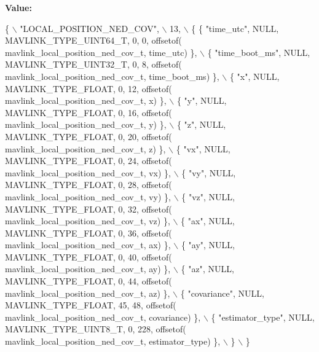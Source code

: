 {\bfseries Value\+:}
\begin{DoxyCode}
\{ \(\backslash\)
    \textcolor{stringliteral}{"LOCAL\_POSITION\_NED\_COV"}, \(\backslash\)
    13, \(\backslash\)
    \{  \{ \textcolor{stringliteral}{"time\_utc"}, NULL, MAVLINK_TYPE_UINT64_T, 0, 0, offsetof(
      mavlink_local_position_ned_cov_t, time\_utc) \}, \(\backslash\)
         \{ \textcolor{stringliteral}{"time\_boot\_ms"}, NULL, MAVLINK_TYPE_UINT32_T, 0, 8, offsetof(
      mavlink_local_position_ned_cov_t, time\_boot\_ms) \}, \(\backslash\)
         \{ \textcolor{stringliteral}{"x"}, NULL, MAVLINK_TYPE_FLOAT, 0, 12, offsetof(
      mavlink_local_position_ned_cov_t, x) \}, \(\backslash\)
         \{ \textcolor{stringliteral}{"y"}, NULL, MAVLINK_TYPE_FLOAT, 0, 16, offsetof(
      mavlink_local_position_ned_cov_t, y) \}, \(\backslash\)
         \{ \textcolor{stringliteral}{"z"}, NULL, MAVLINK_TYPE_FLOAT, 0, 20, offsetof(
      mavlink_local_position_ned_cov_t, z) \}, \(\backslash\)
         \{ \textcolor{stringliteral}{"vx"}, NULL, MAVLINK_TYPE_FLOAT, 0, 24, offsetof(
      mavlink_local_position_ned_cov_t, vx) \}, \(\backslash\)
         \{ \textcolor{stringliteral}{"vy"}, NULL, MAVLINK_TYPE_FLOAT, 0, 28, offsetof(
      mavlink_local_position_ned_cov_t, vy) \}, \(\backslash\)
         \{ \textcolor{stringliteral}{"vz"}, NULL, MAVLINK_TYPE_FLOAT, 0, 32, offsetof(
      mavlink_local_position_ned_cov_t, vz) \}, \(\backslash\)
         \{ \textcolor{stringliteral}{"ax"}, NULL, MAVLINK_TYPE_FLOAT, 0, 36, offsetof(
      mavlink_local_position_ned_cov_t, ax) \}, \(\backslash\)
         \{ \textcolor{stringliteral}{"ay"}, NULL, MAVLINK_TYPE_FLOAT, 0, 40, offsetof(
      mavlink_local_position_ned_cov_t, ay) \}, \(\backslash\)
         \{ \textcolor{stringliteral}{"az"}, NULL, MAVLINK_TYPE_FLOAT, 0, 44, offsetof(
      mavlink_local_position_ned_cov_t, az) \}, \(\backslash\)
         \{ \textcolor{stringliteral}{"covariance"}, NULL, MAVLINK_TYPE_FLOAT, 45, 48, offsetof(
      mavlink_local_position_ned_cov_t, covariance) \}, \(\backslash\)
         \{ \textcolor{stringliteral}{"estimator\_type"}, NULL, MAVLINK_TYPE_UINT8_T, 0, 228, offsetof(
      mavlink_local_position_ned_cov_t, estimator\_type) \}, \(\backslash\)
         \} \(\backslash\)
\}
\end{DoxyCode}
\mbox{\label{mavlink__msg__local__position__ned__cov_8h_ab6fca73f2f337d654c04bbd1e1aa3511}} 

